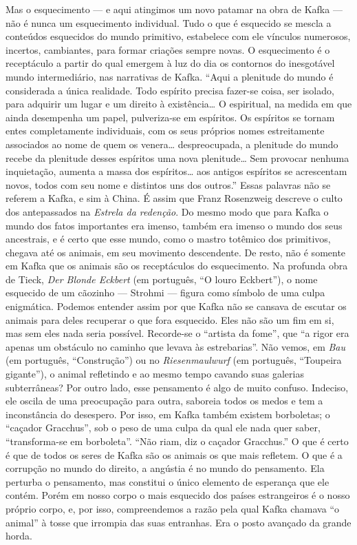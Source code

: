 Mas o esquecimento --- e aqui atingimos um novo patamar na obra de Kafka
--- não é nunca um esquecimento individual. Tudo o que é esquecido se
mescla a conteúdos esquecidos do mundo primitivo, estabelece com ele
vínculos numerosos, incertos, cambiantes, para formar criações sempre
novas. O esquecimento é o receptáculo a partir do qual emergem à luz do
dia os contornos do inesgotável mundo intermediário, nas narrativas de
Kafka. ``Aqui a plenitude do mundo é considerada a única realidade. Todo
espírito precisa fazer-se coisa, ser isolado, para adquirir um lugar e
um direito à existência\ldots{} O espiritual, na medida em que ainda
desempenha um papel, pulveriza-se em espíritos. Os espíritos se tornam
entes completamente individuais, com os seus próprios nomes
estreitamente associados ao nome de quem os venera\ldots{} despreocupada, a
plenitude do mundo recebe da plenitude desses espíritos uma nova
plenitude\ldots{} Sem provocar nenhuma inquietação, aumenta a massa dos
espíritos\ldots{} aos antigos espíritos se acrescentam novos, todos com seu
nome e distintos uns dos outros.'' Essas palavras não se referem a
Kafka, e sim à China. É assim que Franz Rosenzweig descreve o culto dos
antepassados na \textit{Estrela da redenção}. Do mesmo modo que para Kafka o
mundo dos fatos importantes era imenso, também era imenso o mundo dos
seus ancestrais, e é certo que esse mundo, como o mastro totêmico dos
primitivos, chegava até os animais, em seu movimento descendente. De
resto, não é somente em Kafka que os animais são os receptáculos do
esquecimento. Na profunda obra de Tieck, \textit{Der Blonde Eckbert} (em português, ``O louro Eckbert''), o nome esquecido de um cãozinho --- Strohmi --- figura como
símbolo de uma culpa enigmática. Podemos entender assim por que Kafka
não se cansava de escutar os animais para deles recuperar o que fora
esquecido. Eles não são um fim em si, mas sem eles nada seria possível.
Recorde-se o ``artista da fome'', que ``a rigor era apenas um obstáculo
no caminho que levava às estrebarias''. Não vemos, em \textit{Bau}
(em português, ``Construção'') ou no \textit{Riesenmaulwurf} (em português, ``Toupeira gigante''), o animal
refletindo e ao mesmo tempo cavando suas galerias subterrâneas? Por
outro lado, esse pensamento é algo de muito confuso. Indeciso, ele
oscila de uma preocupação para outra, saboreia todos os medos e tem a
inconstância do desespero. Por isso, em Kafka também existem borboletas;
o ``caçador Gracchus'', sob o peso de uma culpa da qual ele nada quer
saber, ``transforma-se em borboleta''. ``Não riam, diz o caçador
Gracchus.'' O que é certo é que de todos os seres de Kafka são os
animais os que mais refletem. O que é a corrupção no mundo do direito, a
angústia é no mundo do pensamento. Ela perturba o pensamento, mas
constitui o único elemento de esperança que ele contém. Porém em nosso
corpo o mais esquecido dos países estrangeiros é o nosso próprio corpo,
e, por isso, compreendemos a razão pela qual Kafka chamava ``o animal''
à tosse que irrompia das suas entranhas. Era o posto avançado da grande
horda.

